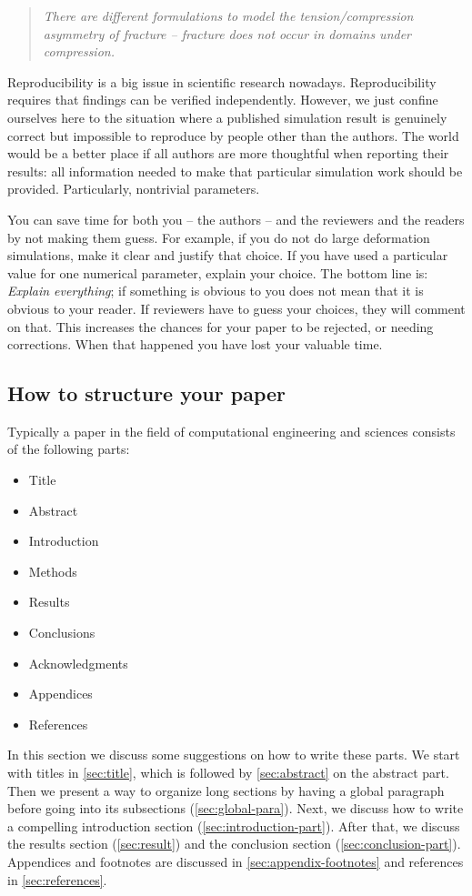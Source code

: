 \documentclass[authoryear,12pta4paper,fleqn]{article}
\numberwithin{equation}{section}
\theoremstyle{remark}
\begin{document}
 \begin{quote}
    \textit{There are different formulations  to model the tension/compression asymmetry of 
    fracture – fracture does not occur in domains under compression.}
 \end{quote}


Reproducibility is a big issue in scientific research nowadays. Reproducibility requires that findings can be verified independently.
However, we just confine ourselves here to the situation where a published simulation result is genuinely correct but impossible to reproduce by people other than the authors. The world would be a better place if all authors are more thoughtful when reporting their results: all information needed to make that particular simulation work should be provided. Particularly, nontrivial parameters.


You can save time for both you -- the authors -- and the reviewers and the readers by not making them guess. For example, if you do not do large deformation simulations, make it clear and justify that choice. If you have used a particular value for one numerical parameter, explain your choice. The bottom line is: \textit{Explain everything}; if something is obvious to you does not mean that it is obvious to your reader. If reviewers have to guess your choices, they will comment on that. This increases the chances for your paper to be rejected, or needing corrections. When that happened you have lost your valuable time.




\subsection{How to structure your paper}\label{structure}

Typically a paper in the field of  computational engineering and sciences consists of the following parts:

\begin{itemize}
    \item Title
    \item Abstract
    \item Introduction
    \item Methods
    \item Results
    \item Conclusions
    \item Acknowledgments
    \item Appendices
    \item References
\end{itemize}
 In this section we discuss some suggestions on how to write  these parts. We start with titles in \cref{sec:title}, which is followed by \cref{sec:abstract} on the abstract part. Then we present a way to organize long sections by having a global paragraph before going into its subsections (\cref{sec:global-para}). Next, we discuss how to write a compelling introduction section (\cref{sec:introduction-part}). After that, we discuss the results section (\cref{sec:result}) and the conclusion section (\cref{sec:conclusion-part}).  Appendices and footnotes are discussed in \cref{sec:appendix-footnotes} and references in \cref{sec:references}.
\end{document}
